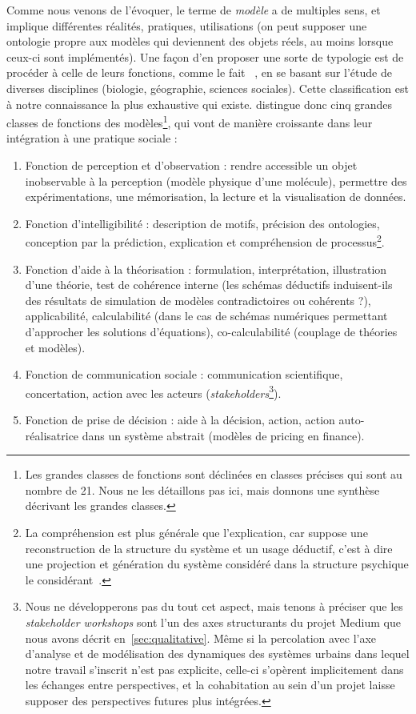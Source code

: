 Comme nous venons de l'évoquer, le terme de \emph{modèle} a de multiples sens, et implique différentes réalités, pratiques, utilisations (on peut supposer une ontologie propre aux modèles qui deviennent des objets réels, au moins lorsque ceux-ci sont implémentés). Une façon d'en proposer une sorte de typologie est de procéder à celle de leurs fonctions, comme le fait~\cite{varenne2017theories} , en se basant sur l'étude de diverses disciplines (biologie, géographie, sciences sociales). Cette classification est à notre connaissance la plus exhaustive qui existe.  distingue donc cinq grandes classes de fonctions des modèles\footnote{Les grandes classes de fonctions sont déclinées en classes précises qui sont au nombre de 21. Nous ne les détaillons pas ici, mais donnons une synthèse décrivant les grandes classes.}, qui vont de manière croissante dans leur intégration à une pratique sociale : 
\begin{enumerate}
	\item Fonction de perception et d'observation : rendre accessible un objet inobservable à la perception (modèle physique d'une molécule), permettre des expérimentations, une mémorisation, la lecture et la visualisation de données.
	\item Fonction d'intelligibilité : description de motifs, précision des ontologies, conception par la prédiction, explication et compréhension de processus\footnote{La compréhension est plus générale que l'explication, car suppose une reconstruction de la structure du système et un usage déductif, c'est à dire une projection et génération du système considéré dans la structure psychique le considérant~\cite{morin1980methode}.}.
	\item Fonction d'aide à la théorisation : formulation, interprétation, illustration d'une théorie, test de cohérence interne (les schémas déductifs induisent-ils des résultats de simulation de modèles contradictoires ou cohérents ?), applicabilité, calculabilité (dans le cas de schémas numériques permettant d'approcher les solutions d'équations), co-calculabilité (couplage de théories et modèles).
	\item Fonction de communication sociale : communication scientifique, concertation, action avec les acteurs (\emph{stakeholders}\footnote{Nous ne développerons pas du tout cet aspect, mais tenons à préciser que les \emph{stakeholder workshops} sont l'un des axes structurants du projet Medium que nous avons décrit en~\ref{sec:qualitative}. Même si la percolation avec l'axe d'analyse et de modélisation des dynamiques des systèmes urbains dans lequel notre travail s'inscrit n'est pas explicite, celle-ci s'opèrent implicitement dans les échanges entre perspectives, et la cohabitation au sein d'un projet laisse supposer des perspectives futures plus intégrées.}).
	\item Fonction de prise de décision : aide à la décision, action, action auto-réalisatrice dans un système abstrait (modèles de pricing en finance).
\end{enumerate}


